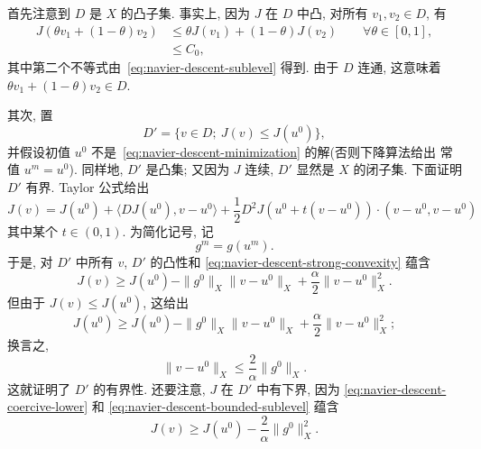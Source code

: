 \begin{Proof}
首先注意到 $D$ 是 $X$ 的凸子集. 事实上, 因为 $J$ 在 $D$ 中凸, 对所有
$v_1,v_2\in D$, 有
\[
\begin{aligned}
J(\theta v_1+(1-\theta)v_2)
&\leq \theta J(v_1)+(1-\theta)J(v_2)\qquad\forall\theta\in[0,1],\\
&\leq C_0,
\end{aligned}
\]
其中第二个不等式由 \,\eqref{eq:navier-descent-sublevel} 得到. 由于 $D$ 连通,
这意味着 $\theta v_1+(1-\theta)v_2\in D$.

其次, 置
\[
D'=\{v\in D;\ J(v)\leq J(u^0)\},
\]
并假设初值 $u^0$ 不是 \,\eqref{eq:navier-descent-minimization} 的解(否则下降算法给出
常值 $u^m=u^0$). 同样地, $D'$ 是凸集; 又因为 $J$ 连续, $D'$ 显然是 $X$
的闭子集. 下面证明 $D'$ 有界. Taylor 公式给出
\[
J(v)=J(u^0)+\langle DJ(u^0),v-u^0\rangle
+\frac12D^2J(u^0+t(v-u^0))\mathbin{\cdot}(v-u^0,v-u^0)
\]
其中某个 $t\in(0,1)$. 为简化记号, 记
\[
g^m=g(u^m).
\]
于是, 对 $D'$ 中所有 $v$, $D'$ 的凸性和
\eqref{eq:navier-descent-strong-convexity} 蕴含
\begin{equation}
\label{eq:navier-descent-coercive-lower}
J(v)\geq J(u^0)-\|g^0\|_X\|v-u^0\|_X
+\frac\alpha2\|v-u^0\|_X^2.
\end{equation}
但由于 $J(v)\leq J(u^0)$, 这给出
\[
J(u^0)\geq J(u^0)-\|g^0\|_X\|v-u^0\|_X
+\frac\alpha2\|v-u^0\|_X^2;
\]
换言之,
\begin{equation}
\label{eq:navier-descent-bounded-sublevel}
\|v-u^0\|_X\leq\frac2\alpha\|g^0\|_X.
\end{equation}
这就证明了 $D'$ 的有界性. 还要注意, $J$ 在 $D'$ 中有下界, 因为
\eqref{eq:navier-descent-coercive-lower} 和
\eqref{eq:navier-descent-bounded-sublevel} 蕴含
\begin{equation}
\label{eq:navier-descent-functional-lower}
J(v)\geq J(u^0)-\frac2\alpha\|g^0\|_X^2.
\end{equation}


\end{Proof}
